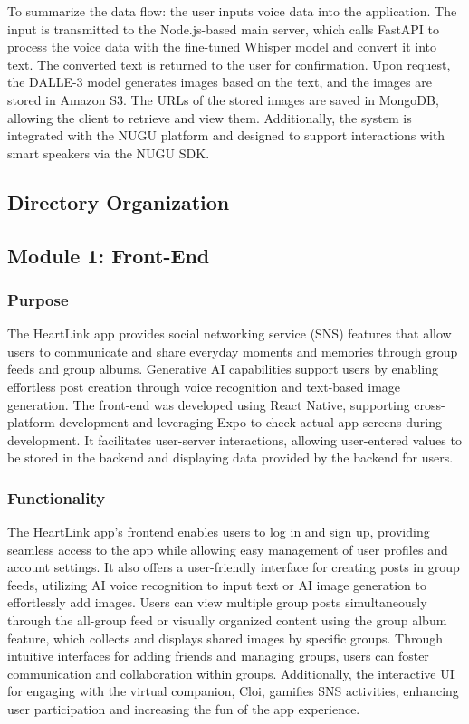 To summarize the data flow: the user inputs voice data into the application. The input is transmitted to the Node.js-based main server, which calls FastAPI to process the voice data with the fine-tuned Whisper model and convert it into text. The converted text is returned to the user for confirmation. Upon request, the DALLE-3 model generates images based on the text, and the images are stored in Amazon S3. The URLs of the stored images are saved in MongoDB, allowing the client to retrieve and view them. Additionally, the system is integrated with the NUGU platform and designed to support interactions with smart speakers via the NUGU SDK.

 
    \subsection{Directory Organization}
        \subsection{Module 1: Front-End}
            \subsubsection{Purpose}
            The HeartLink app provides social networking service (SNS) features that allow users to communicate and share everyday moments and memories through group feeds and group albums. Generative AI capabilities support users by enabling effortless post creation through voice recognition and text-based image generation. The front-end was developed using React Native, supporting cross-platform development and leveraging Expo to check actual app screens during development. It facilitates user-server interactions, allowing user-entered values to be stored in the backend and displaying data provided by the backend for users.\\
            \vspace{3mm}
            \subsubsection{Functionality}
            The HeartLink app's frontend enables users to log in and sign up, providing seamless access to the app while allowing easy management of user profiles and account settings. It also offers a user-friendly interface for creating posts in group feeds, utilizing AI voice recognition to input text or AI image generation to effortlessly add images. Users can view multiple group posts simultaneously through the all-group feed or visually organized content using the group album feature, which collects and displays shared images by specific groups. Through intuitive interfaces for adding friends and managing groups, users can foster communication and collaboration within groups. Additionally, the interactive UI for engaging with the virtual companion, Cloi, gamifies SNS activities, enhancing user participation and increasing the fun of the app experience.\\
            \vspace{3mm}
